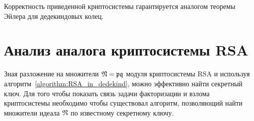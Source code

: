 \documentclass[_00_dissertation.tex]{subfiles}
\begin{document}
\begin{remark}
    Корректность приведенной криптосистемы гарантируется аналогом теоремы Эйлера для дедекиндовых колец.
\end{remark}

\section{Анализ аналога криптосистемы RSA}

Зная разложение на множители $\mathfrak{N} = \mathfrak{p}\mathfrak{q}$ модуля криптосистемы RSA и используя алгоритм~\ref{algorithm:RSA_in_dedekind}, можно эффективно найти секретный ключ.
Для того чтобы показать связь задачи факторизации и взлома криптосистемы необходимо чтобы существовал алгоритм, позволяющий найти множители идеала $\mathfrak{N}$ по известному секретному ключу.
\end{document}
